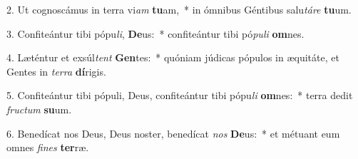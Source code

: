 2. Ut cognoscámus in terra vi\textit{am} \textbf{tu}am,~*  in ómnibus Géntibus salu\textit{tá}\textit{re} \textbf{tu}um.\

3. Confiteántur tibi pópu\textit{li}, \textbf{De}us:~*  confiteántur tibi pó\textit{pu}\textit{li} \textbf{om}nes.\

4. Læténtur et exsúl\textit{tent} \textbf{Gen}tes:~*  quóniam júdicas pópulos in æquitáte, et Gentes in \textit{ter}\textit{ra} \textbf{dí}rigis.\

5. Confiteántur tibi pópuli, Deus, confiteántur tibi pópu\textit{li} \textbf{om}nes:~*  terra dedit \textit{fruc}\textit{tum} \textbf{su}um.\

6. Benedícat nos Deus, Deus noster, benedícat \textit{nos} \textbf{De}us:~*  et métuant eum omnes \textit{fi}\textit{nes} \textbf{ter}ræ.\

